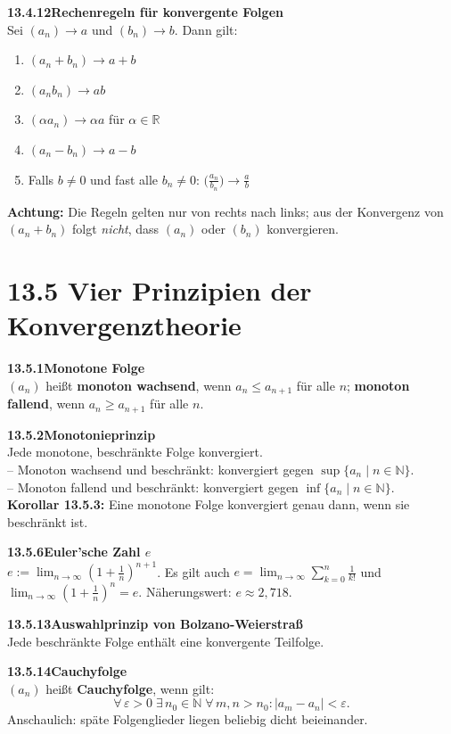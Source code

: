 \documentclass[a4paper,12pt]{article}
\newcommand{\gentry}[3]{%
  \noindent\textbf{#1\quad #2}\nopagebreak\\[0.2em]
  #3\par\smallskip
}
\begin{document}
\gentry{13.4.12}{Rechenregeln für konvergente Folgen}{%
  Sei $(a_n) \to a$ und $(b_n) \to b$. Dann gilt:
  \begin{enumerate}[label=(\arabic*),topsep=2pt,itemsep=1pt]
    \item $(a_n + b_n) \to a + b$
    \item $(a_n b_n) \to ab$
    \item $(\alpha a_n) \to \alpha a$ für $\alpha \in \mathbb{R}$
    \item $(a_n - b_n) \to a - b$
    \item Falls $b \neq 0$ und fast alle $b_n \neq 0$: $\bigl(\tfrac{a_n}{b_n}\bigr) \to \tfrac{a}{b}$
  \end{enumerate}
  \textbf{Achtung:} Die Regeln gelten nur von rechts nach links;
  aus der Konvergenz von $(a_n + b_n)$ folgt \emph{nicht}, dass $(a_n)$ oder $(b_n)$ konvergieren.
}

\section*{13.5 \quad Vier Prinzipien der Konvergenztheorie}

\gentry{13.5.1}{Monotone Folge}{%
  $(a_n)$ heißt \textbf{monoton wachsend}, wenn $a_n \leq a_{n+1}$ für alle $n$;
  \textbf{monoton fallend}, wenn $a_n \geq a_{n+1}$ für alle $n$.
}

\gentry{13.5.2}{Monotonieprinzip}{%
  Jede monotone, beschränkte Folge konvergiert.\\
  -- Monoton wachsend und beschränkt: konvergiert gegen $\sup\{a_n \mid n \in \mathbb{N}\}$.\\
  -- Monoton fallend und beschränkt: konvergiert gegen $\inf\{a_n \mid n \in \mathbb{N}\}$.\\
  \textbf{Korollar 13.5.3:} Eine monotone Folge konvergiert genau dann, wenn sie beschränkt ist.
}

\gentry{13.5.6}{Euler'sche Zahl $e$}{%
  $e := \lim_{n \to \infty}\!\left(1+\tfrac{1}{n}\right)^{n+1}$.
  Es gilt auch $e = \lim_{n\to\infty}\sum_{k=0}^{n}\tfrac{1}{k!}$
  und $\lim_{n\to\infty}(1+\tfrac{1}{n})^n = e$. Näherungswert: $e \approx 2{,}718$.
}

\gentry{13.5.13}{Auswahlprinzip von Bolzano-Weierstraß}{%
  Jede beschränkte Folge enthält eine konvergente Teilfolge.
}

\gentry{13.5.14}{Cauchyfolge}{%
  $(a_n)$ heißt \textbf{Cauchyfolge}, wenn gilt:
  \[
    \forall\,\varepsilon > 0\;\exists\,n_0 \in \mathbb{N}\;\forall\,m,n > n_0: |a_m - a_n| < \varepsilon.
  \]
  Anschaulich: späte Folgenglieder liegen beliebig dicht beieinander.
}
\end{document}
